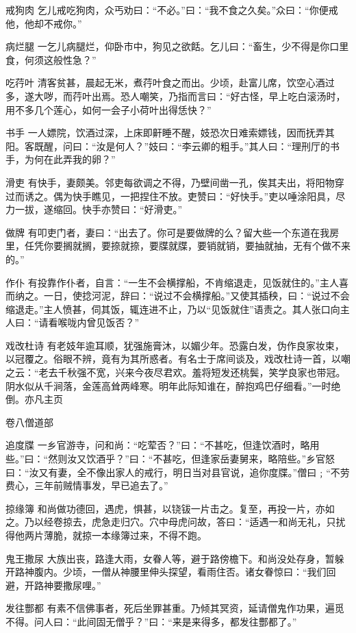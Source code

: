 \documentclass[12pt,UTF8]{ctexbook}
\begin{document}
戒狗肉
乞儿戒吃狗肉，众丐劝曰：“不必。”曰：“我不食之久矣。”众曰：“你便戒他，他却不戒你。”

病烂腿
一乞儿病腿烂，仰卧市中，狗见之欲餂。乞儿曰：“畜生，少不得是你口里食，何须这般性急？”

吃荇叶
清客贫甚，晨起无米，煮荇叶食之而出。少顷，赴富儿席，饮空心酒过多，遂大哕，而荇叶出焉。恐人嘲笑，乃指而言曰：“好古怪，早上吃白滚汤时，用不多几个莲心，如何一会子小荷叶出得恁快？”

书手
一人嫖院，饮酒过深，上床即鼾睡不醒，妓恐次日难索嫖钱，因而抚弄其阳。客既醒，问曰：“汝是何人？”妓曰：“李云卿的粗手。”其人曰：“理刑厅的书手，为何在此弄我的卵？”

滑吏
有快手，妻颇美。邻吏每欲调之不得，乃壁间凿一孔，俟其夫出，将阳物穿过而诱之。偶为快手瞧见，一把捏住不放。吏赞曰：“好快手。”吏以唾涂阳具，尽力一拔，遂缩回。快手亦赞曰：“好滑吏。”

做牌
有叩吏门者，妻曰：“出去了。你可是要做牌的么？留大些一个东道在我房里，任凭你要搁就搁，要捺就捺，要牒就牒，要销就销，要抽就抽，无有个做不来的。”

作仆
有投靠作仆者，自言：“一生不会横撑船，不肯缩退走，见饭就住的。”主人喜而纳之。一日，使捻河泥，辞曰：“说过不会横撑船。”又使其插秧，曰：“说过不会缩退走。”主人愤甚，伺其饭，辄连进不止，乃以“见饭就住”语责之。其人张口向主人曰：“请看喉咙内曾见饭否？”

戏改杜诗
有老妓年逾耳顺，犹强施膏沐，以媚少年。恐露白发，伪作良家妆束，以冠覆之。俗眼不辨，竟有为其所惑者。有名士于席间谈及，戏改杜诗一首，以嘲之云：“老去千秋强不宽，兴来今夜尽君欢。羞将短发还桃鬓，笑学良家也带冠。阴水似从千涧落，金莲高耸两峰寒。明年此际知谁在，醉抱鸡巴仔细看。”一时绝倒。亦凡主页

卷八僧道部

追度牒
一乡官游寺，问和尚：“吃荤否？”曰：“不甚吃，但逢饮酒时，略用些。”曰：“然则汝又饮酒乎？”曰：“不甚吃，但逢家岳妻舅来，略陪些。”乡官怒曰：“汝又有妻，全不像出家人的戒行，明日当对县官说，追你度牒。”僧曰﹔“不劳费心，三年前贼情事发，早已追去了。”

掠缘簿
和尚做功德回，遇虎，惧甚，以铙钹一片击之。复至，再投一片，亦如之。乃以经卷掠去，虎急走归穴。穴中母虎问故，答曰：“适遇一和尚无礼，只扰得他两片薄脆，就掠一本缘簿过来，不得不跑。

鬼王撒尿
大族出丧，路逢大雨，女眷人等，避于路傍檐下。和尚没处存身，暂躲开路神腹内。少顷，一僧从神腰里伸头探望，看雨住否。诸女眷惊曰：“我们回避，开路神要撒尿哩。”

发往酆都
有素不信佛事者，死后坐罪甚重。乃倾其冥资，延请僧鬼作功果，遍觅不得。问人曰：“此间固无僧乎？”曰：“来是来得多，都发往酆都了。”
\end{document}
